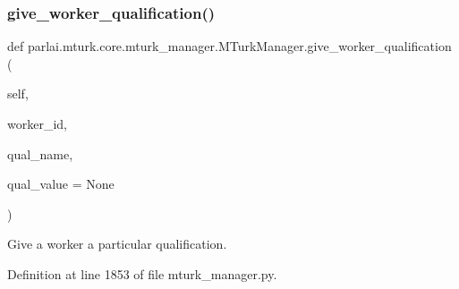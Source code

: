 \subsubsection{\texorpdfstring{give\+\_\+worker\+\_\+qualification()}{give\_worker\_qualification()}}
{\footnotesize\ttfamily def parlai.\+mturk.\+core.\+mturk\+\_\+manager.\+M\+Turk\+Manager.\+give\+\_\+worker\+\_\+qualification (\begin{DoxyParamCaption}\item[{}]{self,  }\item[{}]{worker\+\_\+id,  }\item[{}]{qual\+\_\+name,  }\item[{}]{qual\+\_\+value = {\ttfamily None} }\end{DoxyParamCaption})}

\begin{DoxyVerb}Give a worker a particular qualification.
\end{DoxyVerb}
 

Definition at line 1853 of file mturk\+\_\+manager.\+py.


